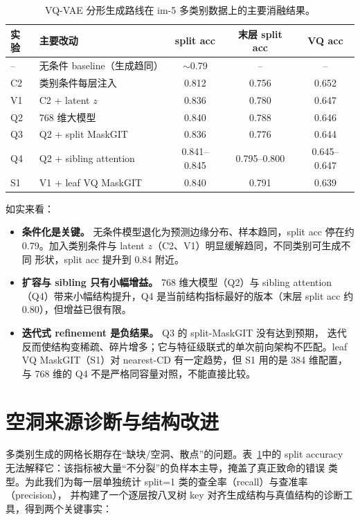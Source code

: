 \documentclass{article}
\begin{document}
\begin{table}[htbp]
    \centering
    \begin{tabular}{llccc}
        \toprule
        实验 & 主要改动 & split acc & 末层 split acc & VQ acc \\
        \midrule
        --  & 无条件 baseline（生成趋同） & $\sim$0.79 & --    & --    \\
        C2  & 类别条件每层注入            & 0.812      & 0.756 & 0.652 \\
        V1  & C2 + latent $z$             & 0.836      & 0.780 & 0.647 \\
        Q2  & 768 维大模型                & 0.840      & 0.788 & 0.646 \\
        Q3  & Q2 + split MaskGIT          & 0.836      & 0.776 & 0.644 \\
        Q4  & Q2 + sibling attention      & 0.841--0.845 & 0.795--0.800 & 0.645--0.647 \\
        S1  & V1 + leaf VQ MaskGIT        & 0.840      & 0.791 & 0.639 \\
        \bottomrule
    \end{tabular}
    \caption{VQ-VAE 分形生成路线在 im-5 多类别数据上的主要消融结果。}
    \label{tab:ablation}
\end{table}

如实来看：

\begin{itemize}
    \item \textbf{条件化是关键。} 无条件模型退化为预测边缘分布、样本趋同，split acc
    停在约 0.79。加入类别条件与 latent $z$（C2、V1）明显缓解趋同，不同类别可生成不同
    形状，split acc 提升到 0.84 附近。
    \item \textbf{扩容与 sibling 只有小幅增益。} 768 维大模型（Q2）与 sibling
    attention（Q4）带来小幅结构提升，Q4 是当前结构指标最好的版本（末层 split acc
    约 0.80），但增益已很有限。
    \item \textbf{迭代式 refinement 是负结果。} Q3 的 split-MaskGIT 没有达到预期，
    迭代反而使结构变稀疏、碎片增多；它与特征级联式的单次前向架构不匹配。leaf VQ
    MaskGIT（S1）对 nearest-CD 有一定趋势，但 S1 用的是 384 维配置，与 768 维的 Q4
    不是严格同容量对照，不能直接比较。
\end{itemize}

\section{空洞来源诊断与结构改进}
\label{sec:diag}
多类别生成的网格长期存在``缺块/空洞、散点''的问题。表~\ref{tab:ablation}中的
split accuracy 无法解释它：该指标被大量``不分裂''的负样本主导，掩盖了真正致命的错误
类型。为此我们为每一层单独统计 split=1 类的查全率（recall）与查准率（precision），
并构建了一个逐层按八叉树 key 对齐生成结构与真值结构的诊断工具，得到两个关键事实：
\end{document}
